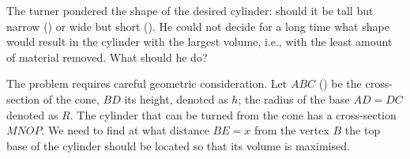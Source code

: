 The turner pondered the shape of the desired cylinder: should it be tall but narrow () or wide but short (). He could not decide for a long time what shape would result in the cylinder with the largest volume, i.e., with the least amount of material removed. What should he do?





\ans The problem requires careful geometric consideration. Let $ABC$ () be the cross-section of the cone, $BD$ its height, denoted as $h$; the radius of the base $AD = DC$ denoted as $R$. The cylinder that can be turned from the cone has a cross-section $MNOP$. We need to find at what distance $BE = x$ from the vertex $B$ the top base of the cylinder should be located so that its volume is maximised.

